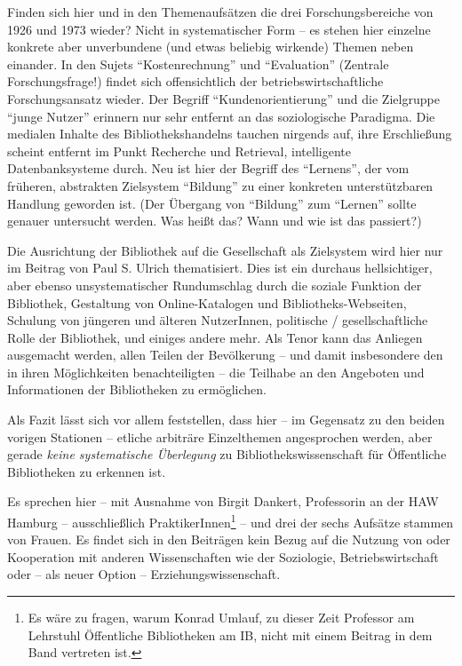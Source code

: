 \documentclass[a4paper,
fontsize=11pt,
oneside,
numbers=noperiodatend,
parskip=half-,
bibliography=totoc,
final
]{scrartcl}
\begin{document}
Finden sich hier und in den Themenaufsätzen die drei Forschungsbereiche
von 1926 und 1973 wieder? Nicht in systematischer Form -- es stehen hier
einzelne konkrete aber unverbundene (und etwas beliebig wirkende) Themen
neben einander. In den Sujets \enquote{Kostenrechnung} und
\enquote{Evaluation} (Zentrale Forschungsfrage!) findet sich
offensichtlich der betriebswirtschaftliche Forschungsansatz wieder. Der
Begriff \enquote{Kundenorientierung} und die Zielgruppe \enquote{junge
Nutzer} erinnern nur sehr entfernt an das soziologische Paradigma. Die
medialen Inhalte des Bibliothekshandelns tauchen nirgends auf, ihre
Erschließung scheint entfernt im Punkt Recherche und Retrieval,
intelligente Datenbanksysteme durch. Neu ist hier der Begriff des
\enquote{Lernens}, der vom früheren, abstrakten Zielsystem
\enquote{Bildung} zu einer konkreten unterstützbaren Handlung geworden
ist. (Der Übergang von \enquote{Bildung} zum \enquote{Lernen} sollte
genauer untersucht werden. Was heißt das? Wann und wie ist das
passiert?)

Die Ausrichtung der Bibliothek auf die Gesellschaft als Zielsystem wird
hier nur im Beitrag von Paul S. Ulrich thematisiert. Dies ist ein
durchaus hellsichtiger, aber ebenso unsystematischer Rundumschlag durch
die soziale Funktion der Bibliothek, Gestaltung von Online-Katalogen und
Bibliotheks-Webseiten, Schulung von jüngeren und älteren NutzerInnen,
politische / gesellschaftliche Rolle der Bibliothek, und einiges andere
mehr. Als Tenor kann das Anliegen ausgemacht werden, allen Teilen der
Bevölkerung -- und damit insbesondere den in ihren Möglichkeiten
benachteiligten -- die Teilhabe an den Angeboten und Informationen der
Bibliotheken zu ermöglichen.

Als Fazit lässt sich vor allem feststellen, dass hier -- im Gegensatz zu
den beiden vorigen Stationen -- etliche arbiträre Einzelthemen
angesprochen werden, aber gerade \emph{keine systematische Überlegung}
zu Bibliothekswissenschaft für Öffentliche Bibliotheken zu erkennen ist.

Es sprechen hier -- mit Ausnahme von Birgit Dankert, Professorin an der
HAW Hamburg -- ausschließlich PraktikerInnen\footnote{Es wäre zu fragen,
  warum Konrad Umlauf, zu dieser Zeit Professor am Lehrstuhl Öffentliche
  Bibliotheken am IB, nicht mit einem Beitrag in dem Band vertreten ist.}
-- und drei der sechs Aufsätze stammen von Frauen. Es findet sich in den
Beiträgen kein Bezug auf die Nutzung von oder Kooperation mit anderen
Wissenschaften wie der Soziologie, Betriebswirtschaft oder -- als neuer
Option -- Erziehungswissenschaft.
\end{document}
